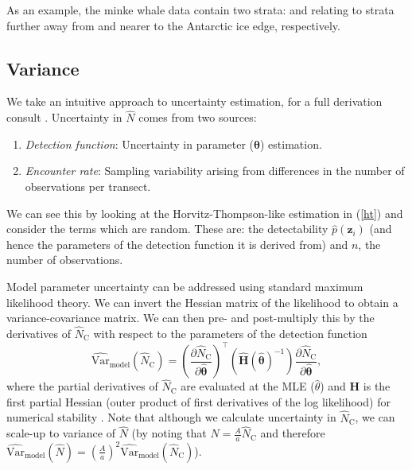 \documentclass[article]{jss}\usepackage[]{graphicx}\usepackage[]{color}
\begin{document}
As an example, the minke whale data contain two strata:  and  relating to strata further away from and nearer to the Antarctic ice edge, respectively.

\subsection{Variance}

We take an intuitive approach to uncertainty estimation, for a full derivation consult \cite{Marques:2003vb}. Uncertainty in $\hat{N}$ comes from two sources:

\begin{enumerate}
\item \textit{Detection function}: Uncertainty in parameter ($\boldsymbol{\theta}$) estimation.
\item \textit{Encounter rate}: Sampling variability arising from differences in the number of observations per transect.
\end{enumerate}

We can see this by looking at the Horvitz-Thompson-like estimation in (\ref{ht}) and consider the terms which are random. These are: the detectability $\hat{p}(\mathbf{z}_i)$ (and hence the parameters of the detection function it is derived from) and $n$, the number of observations.

Model parameter uncertainty can be addressed using standard maximum likelihood theory. We can invert the Hessian matrix of the likelihood to obtain a variance-covariance matrix. We can then pre- and post-multiply this by the derivatives of $\hat{N}_\text{C}$ with respect to the parameters of the detection function
$$
\widehat{\text{Var}}_\text{model}\left( \hat{N}_\text{C}\right) = \left(\frac{\partial \hat{N}_\text{C}}{\partial\hat{\boldsymbol{\theta}}}\right)^\top \left(\hat{\mathbf{H}}(\hat{\boldsymbol{\theta}})^{-1} \right)\frac{\partial \hat{N}_\text{C}}{\partial\hat{\boldsymbol{\theta}}},
$$
where the partial derivatives of $\hat{N}_\text{C}$ are evaluated at the MLE ($\hat{\theta}$) and $\mathbf{H}$ is the first partial Hessian (outer product of first derivatives of the log likelihood) for numerical stability \citep[][p 62]{Buckland:2001vm}. Note that although we calculate uncertainty in $\hat{N}_\text{C}$, we can scale-up to variance of $\hat{N}$ (by noting that $\hat{N} = \frac{A}{a} \hat{N}_\text{C}$ and therefore $\widehat{\text{Var}}_\text{model}\left(\hat{N}\right) = \left( \frac{A}{a} \right)^2 \widehat{\text{Var}}_\text{model} \left(\hat{N}_\text{C} \right)$).
\end{document}
